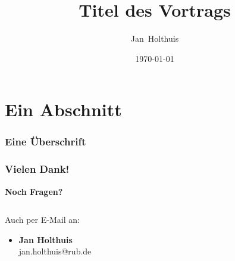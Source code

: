 \documentclass[alternativetitlepage=bild,cornerlogo=hgi_nds_logo2]{rubpresentation}
\title%
{Titel des Vortrags}
\author[Holthuis]{Jan~Holthuis}
\institute[Ruhr-Uni Bochum]
{%
Lehrstuhl für Netz- und Datensicherheit\\
Ruhr-Universität Bochum
}
\date%
{\today}
\begin{document}
\frame[plain]{\titlepage}



\section[Section]{Ein Abschnitt}

\begin{frame}[plain]
    \frametitle{Eine Überschrift}
\blindtext{}
\end{frame}


\begin{frame}[plain]
\frametitle{Vielen Dank!}
 \begin{center}
 {\bfseries\fontsize{30pt}{1.2em}\selectfont Noch Fragen?}
 \end{center}
  \begin{columns}
    \begin{column}{0.5\textwidth}
      \begin{center}
        Auch per E-Mail an:
        \begin{itemize}
        \item \textbf{Jan Holthuis}\\
              jan.holthuis@rub.de
        \end{itemize}
      \end{center}
    \end{column}
    \begin{column}{0.5\textwidth}
      \begin{center}
      \end{center}
    \end{column}
  \end{columns}
\end{frame}
\end{document}
